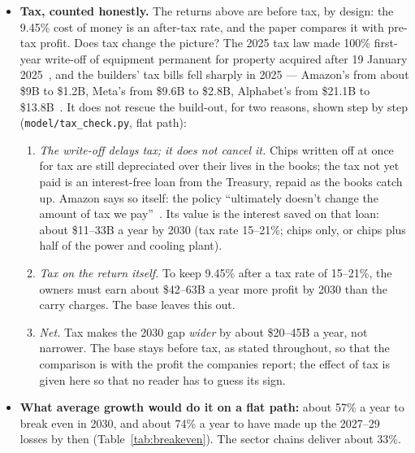 \documentclass[11pt,letterpaper]{article}
\begin{document}
\begin{itemize}
\begin{enumerate}
  \item \emph{Why the payback year does not move.} To state everything in today's money, each year's hole and each year's recovery are divided by the same price level. Dividing a number by a positive number never changes its sign, so whether and when the hole closes is the same either way. On the full count of builders it does not close by 2035 on any path, in either kind of dollar (Table~\ref{tab:cumwacc}, both halves). Deflating the 9.45\% rate a second time would have pushed payback later for no reason: that is the double count avoided.
  \item \emph{What does change.} The return investors keep. In 2035 the flat path's average return is about $-$4\% in dollars of each year, $(0.960/1.026)-1\approx-6.4\%$ in today's money ($-$6.5\% across the Monte Carlo draws, with drawn inflation): losing purchasing power every year for nine years.
  \end{enumerate}
\item \textbf{Tax, counted honestly.} The returns above are before tax, by design: the 9.45\% cost of money is an after-tax rate, and the paper compares it with pre-tax profit. Does tax change the picture? The 2025 tax law made 100\% first-year write-off of equipment permanent for property acquired after 19 January 2025~\cite{ref:irs_notice_2026_11}, and the builders' tax bills fell sharply in 2025 --- Amazon's from about \$9B to \$1.2B, Meta's from \$9.6B to \$2.8B, Alphabet's from \$21.1B to \$13.8B~\cite{ref:yahoo_tax_2026}. It does not rescue the build-out, for two reasons, shown step by step (\texttt{model/tax\_check.py}, flat path):
  \begin{enumerate}
  \item \emph{The write-off delays tax; it does not cancel it.} Chips written off at once for tax are still depreciated over their lives in the books; the tax not yet paid is an interest-free loan from the Treasury, repaid as the books catch up. Amazon says so itself: the policy ``ultimately doesn't change the amount of tax we pay''~\cite{ref:yahoo_tax_2026}. Its value is the interest saved on that loan: about \$11--33B a year by 2030 (tax rate 15--21\%; chips only, or chips plus half of the power and cooling plant).
  \item \emph{Tax on the return itself.} To keep 9.45\% after a tax rate of 15--21\%, the owners must earn about \$42--63B a year more profit by 2030 than the carry charges. The base leaves this out.
  \item \emph{Net.} Tax makes the 2030 gap \emph{wider} by about \$20--45B a year, not narrower. The base stays before tax, as stated throughout, so that the comparison is with the profit the companies report; the effect of tax is given here so that no reader has to guess its sign.
  \end{enumerate}
\item \textbf{What average growth would do it on a flat path:} about 57\% a year to break even in 2030, and about 74\% a year to have made up the 2027--29 losses by then (Table~\ref{tab:breakeven}). The sector chains deliver about 33\%.
\end{itemize}
\end{document}
